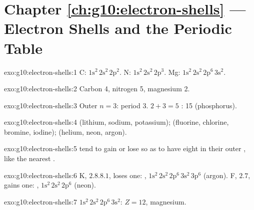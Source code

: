 \section*{Chapter \ref{ch:g10:electron-shells} --- Electron Shells and the Periodic Table}

\begin{solution}{exo:g10:electron-shells:1}
C: $1\mathrm{s}^2\,2\mathrm{s}^2\,2\mathrm{p}^2$. N:
$1\mathrm{s}^2\,2\mathrm{s}^2\,2\mathrm{p}^3$. Mg:
$1\mathrm{s}^2\,2\mathrm{s}^2\,2\mathrm{p}^6\,3\mathrm{s}^2$.
\end{solution}

\begin{solution}{exo:g10:electron-shells:2}
Carbon 4, nitrogen 5, magnesium 2.
\end{solution}

\begin{solution}{exo:g10:electron-shells:3}
Outer  $n = 3$: period 3. $2 + 3 = 5$ :  15
(phosphorus).
\end{solution}

\begin{solution}{exo:g10:electron-shells:4}
 (lithium, sodium, potassium);  (fluorine,
chlorine, bromine, iodine);  (helium, neon, argon).
\end{solution}

\begin{solution}{exo:g10:electron-shells:5}
 tend to gain or lose  so as to have eight  in
their outer , like the nearest .
\end{solution}

\begin{solution}{exo:g10:electron-shells:6}
K, $2.8.8.1$, loses one: ,
$1\mathrm{s}^2\,2\mathrm{s}^2\,2\mathrm{p}^6\,3\mathrm{s}^2\,3\mathrm{p}^6$
(argon). F, $2.7$, gains one: ,
$1\mathrm{s}^2\,2\mathrm{s}^2\,2\mathrm{p}^6$ (neon).
\end{solution}

\begin{solution}{exo:g10:electron-shells:7}
$1\mathrm{s}^2\,2\mathrm{s}^2\,2\mathrm{p}^6\,3\mathrm{s}^2$: $Z = 12$,
magnesium.
\end{solution}

